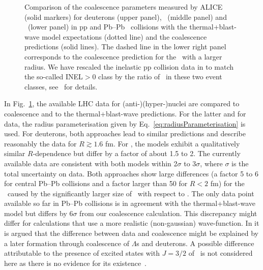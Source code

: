 \documentclass[%
 reprint,
 amsmath,amssymb,
 aps,
]{revtex4-1}
\begin{document}
\begin{figure}[!h]
\begin{center}
		\caption{Comparison of the coalescence parameters measured by ALICE (solid markers) for deuterons (upper panel), \hethree\ (middle panel) and \hthreelambda\ (lower panel) in pp \cite{ALICE:nucleipp2017} and Pb--Pb~\cite{ALICE:deuteronppPbPb2015, Adam:2015yta} collisions with the  thermal+blast-wave model expectations (dotted line) and the coalescence predictions (solid lines). The dashed line in the lower right panel corresponds to the coalescence prediction for the \hthreelambda\ with a larger radius. We have rescaled the inelastic pp collision data in \cite{ALICE:nucleipp2017} to match the so-called INEL$>$0 class by the ratio of \avdNdeta~in these two event classes, see~\cite{Adam:2015gka} for details. 
		}
		\label{fig:CompareThermalAndCoalescence}
	\end{center}
\end{figure}

In Fig.~\ref{fig:CompareThermalAndCoalescence}, the available LHC data for \mbox{(anti-)(hyper-)nuclei} \cite{ALICE:nucleipp2017,ALICE:deuteronppPbPb2015,Adam:2015yta} are compared to coalescence and to the thermal+blast-wave predictions.
For the latter and for data, the radius parameterisation given by Eq.~\ref{eq:radiusParameterisation} is used.
For deuterons, both approaches lead to similar predictions and describe reasonably the data for $R \gtrsim 1.6$ fm. 
For \hethree, the models exhibit a qualitatively similar $R$-dependence but differ by a factor of about 1.5 to 2. 
The currently available data are consistent with both models within 2$\sigma$ to 3$\sigma$, where $\sigma$ is the total uncertainty on data. 
Both approaches show large differences (a factor 5 to 6 for central Pb--Pb collisions and a factor larger than 50 for $R < 2$ fm) for the \hthreelambda\ caused by the significantly larger size of \hthreelambda\ with respect to \hethree. 
The only data point available so far in Pb--Pb collisions is in agreement with the thermal+blast-wave model but differs by 6$\sigma$ from our coalescence calculation. This discrepancy might differ for calculations that use a more realistic (non-gaussian) wave-function.
In \cite{Zhang:2018euf} it is argued that the difference between data and coalescence might be explained by a later formation through coalescence of $\Lambda$s and deuterons. 
A possible difference attributable to the presence of excited states with $J=3/2$ of \hthreelambda~is not considered here as there is no evidence for its existence~\cite{Mart:1996ay}. 
\end{document}
